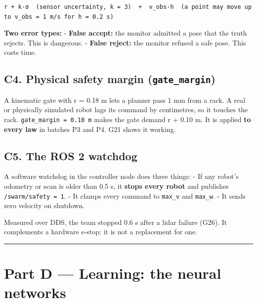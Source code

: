\documentclass[
  10.5pt,
  a4paper,
]{article}
\begin{document}
\begin{verbatim}
r + k·σ  (sensor uncertainty, k = 3)  +  v_obs·h  (a point may move up to v_obs = 1 m/s for h = 0.2 s)
\end{verbatim}

\textbf{Two error types:} - \textbf{False accept:} the monitor admitted
a pose that the truth rejects. This is dangerous. - \textbf{False
reject:} the monitor refused a safe pose. This costs time.

\hypertarget{c4.-physical-safety-margin-gate_margin}{%
\subsection{\texorpdfstring{C4. Physical safety margin
(\texttt{gate\_margin})}{C4. Physical safety margin (gate\_margin)}}\label{c4.-physical-safety-margin-gate_margin}}

A kinematic gate with r = 0.18 m lets a planner pass 1 mm from a rack. A
real or physically simulated robot lags its command by centimetres, so
it touches the rack. \texttt{gate\_margin\ =\ 0.10\ m} makes the gate
demand r + 0.10 m. It is applied \textbf{to every law} in batches P3 and
P4. G21 shows it working.

\hypertarget{c5.-the-ros-2-watchdog}{%
\subsection{C5. The ROS 2 watchdog}\label{c5.-the-ros-2-watchdog}}

A software watchdog in the controller node does three things: - If any
robot's odometry or scan is older than 0.5 s, it \textbf{stops every
robot} and publishes \texttt{/swarm/safety\ =\ 1}. - It clamps every
command to \texttt{max\_v} and \texttt{max\_w}. - It sends zero velocity
on shutdown.

Measured over DDS, the team stopped 0.6 s after a lidar failure (G26).
It complements a hardware e-stop; it is not a replacement for one.

\begin{center}\rule{0.5\linewidth}{0.5pt}\end{center}

\hypertarget{part-d-learning-the-neural-networks}{%
\section{Part D --- Learning: the neural
networks}\label{part-d-learning-the-neural-networks}}
\end{document}

